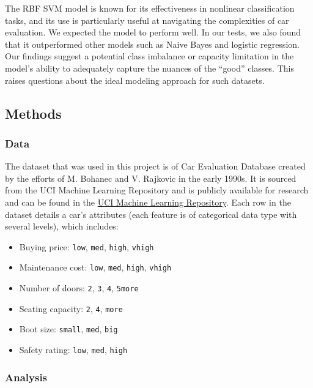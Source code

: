 \documentclass[
  letterpaper,
  DIV=11,
  numbers=noendperiod]{scrartcl}
\providecommand{\tightlist}{%
  \setlength{\itemsep}{0pt}\setlength{\parskip}{0pt}}\usepackage{longtable,booktabs,array}
\begin{document}
The RBF SVM model is known for its effectiveness in nonlinear
classification tasks, and its use is particularly useful at navigating
the complexities of car evaluation. We expected the model to perform
well. In our tests, we also found that it outperformed other models such
as Naive Bayes and logistic regression. Our findings suggest a potential
class imbalance or capacity limitation in the model's ability to
adequately capture the nuances of the ``good'' classes. This raises
questions about the ideal modeling approach for such datasets.

\subsection{Methods}\label{methods}

\subsubsection{Data}\label{data}

The dataset that was used in this project is of Car Evaluation Database
created by the efforts of M. Bohanec and V. Rajkovic in the early 1990s.
It is sourced from the UCI Machine Learning Repository and is publicly
available for research and can be found in the
\href{https://archive.ics.uci.edu/dataset/19/car+evaluation}{UCI Machine
Learning Repository}. Each row in the dataset details a car's attributes
(each feature is of categorical data type with several levels), which
includes:

\begin{itemize}
\tightlist
\item
  Buying price: \texttt{low}, \texttt{med}, \texttt{high},
  \texttt{vhigh}
\item
  Maintenance cost: \texttt{low}, \texttt{med}, \texttt{high},
  \texttt{vhigh}
\item
  Number of doors: \texttt{2}, \texttt{3}, \texttt{4}, \texttt{5more}
\item
  Seating capacity: \texttt{2}, \texttt{4}, \texttt{more}
\item
  Boot size: \texttt{small}, \texttt{med}, \texttt{big}
\item
  Safety rating: \texttt{low}, \texttt{med}, \texttt{high}
\end{itemize}

\subsubsection{Analysis}\label{analysis}
\end{document}
